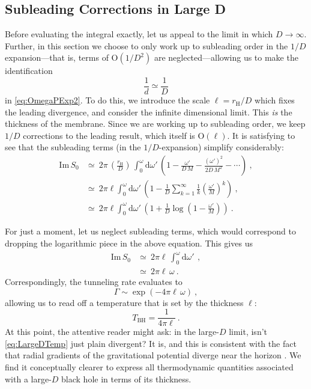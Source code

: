 \documentclass[a4paper,11pt]{article}
\newcommand{\dd}[1]{\text{d}#1 \, }
\newcommand{\im}{\text{Im} \,}
\begin{document}
\subsection{Subleading Corrections in Large D}
\label{sec:SubLargeD}
Before evaluating the integral exactly, let us appeal to the limit in which $D \rightarrow \infty$. Further, in this section we choose to only work up to subleading order in the $1/D$ expansion---that is, terms of O$(1/D^2)$ are neglected---allowing us to make the identification
\begin{equation}
\frac{1}{d} \simeq \frac{1}{D}
\end{equation}
in \eqref{eq:OmegaPExp2}. To do this, we introduce the scale $\ell = r_{\text{H}}/D$ which fixes the leading divergence, and consider the infinite dimensional limit. This \emph{is} the thickness of the membrane. Since we are working up to subleading order, we keep $1/D$ corrections to the leading result, which itself is O$(\ell)$. It is satisfying to see that the subleading terms (in the $1/D$-expansion) simplify considerably:
\begin{align}
\im S_0 &\simeq \ 2\pi \, \left(\frac{r_{\text{H}}}{D} \right) \, \int_{0}^{\omega} \dd{\omega'} \left( 1-\frac{\omega'}{D \, M} -\frac{(\omega')^2}{2D \, M^2} - \cdots\right) \ , \\
&\simeq \ 2\pi \ell \int_{0}^{\omega} \dd{\omega'} \left( 1-\frac{1}{D} \sum_{k = 1}^{\infty} \frac{1}{k} \left(\frac{\omega'}{M}\right)^k \right) \ , \\
&\simeq \ 2\pi \ell \int_{0}^{\omega} \dd{\omega'} \left( 1+\frac{1}{D} \log \left( 1-\frac{\omega'}{M}\right) \right) \ .
\end{align}

For just a moment, let us neglect subleading terms, which would correspond to dropping the logarithmic piece in the above equation. This gives us
\begin{align}
\im S_0 &\simeq \ 2\pi\ell \, \int_{0}^{\omega} \dd{\omega'}  \ , \\
&\simeq \ 2\pi\ell \, \omega  \ .
\end{align}
Correspondingly, the tunneling rate evaluates to
\begin{equation}
\Gamma \sim \exp \left( -4\pi\ell \, \omega \right) \ ,
\end{equation}
allowing us to read off a temperature that is set by the thickness $\ell$:
\begin{equation}
\label{eq:LargeDTemp}
T_{\text{BH}} = \frac{1}{4\pi \ell} \ .
\end{equation}
At this point, the attentive reader might ask: in the large-$D$ limit, isn't \eqref{eq:LargeDTemp} just plain divergent? It is, and this is consistent with the fact that radial gradients of the gravitational potential diverge near the horizon \citep{Emparan:2013moa}. We find it conceptually clearer to express all thermodynamic quantities associated with a large-$D$ black hole in terms of its thickness.
\end{document}
